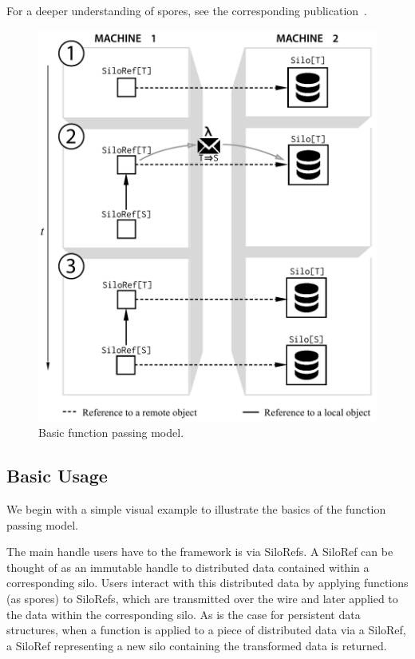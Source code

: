 \documentclass[preprint]{sigplanconf}
\theoremstyle{definition}
\theoremstyle{definition}
\begin{document}
For a deeper understanding of spores, see
the corresponding publication~\cite{Spores}. 

\begin{figure}[t!]
\centering\includegraphics[width=0.8\columnwidth]{basic-diagram.pdf}
\caption{Basic function passing model.}\label{fig:basic-diagram}
\end{figure}

\subsection{Basic Usage}

We begin with a simple visual example to illustrate the basics of
the function passing model.

The main handle users have to the framework is via SiloRefs. A SiloRef can be
thought of as an immutable handle to distributed data contained within a
corresponding silo. Users interact with this distributed data by applying
functions (as spores) to SiloRefs, which  are transmitted over the wire and 
later applied to the data within the corresponding silo. As is the case for 
persistent data structures, when a function is applied to a piece of distributed 
data via a SiloRef, a  SiloRef representing a new silo containing the 
transformed data is returned.
\end{document}

